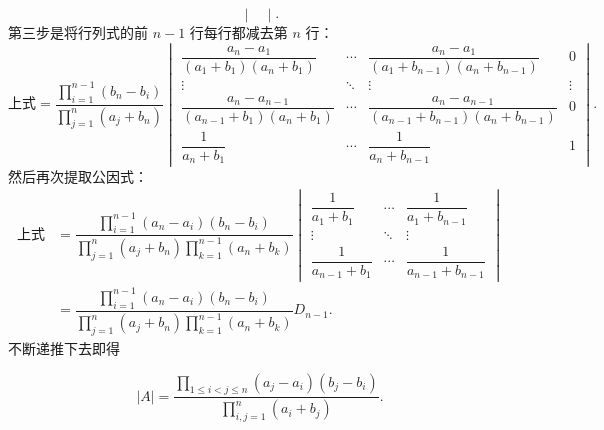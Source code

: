 \documentclass[12pt,fontset=fandol]{ctexart}
\begin{document}
\begin{solve}
\[\begin{vmatrix}
        \end{vmatrix}. \]
    第三步是将行列式的前 $n-1$ 行每行都减去第 $n$ 行：
    \[ \text{上式} = \dfrac{\prod\limits_{i=1}^{n-1}(b_n-b_i)}{\prod\limits_{j=1}^{n}(a_j+b_n)}
        \begin{vmatrix}
            \dfrac{a_n-a_1}{(a_1+b_1)(a_n+b_1)}         & \cdots & \dfrac{a_n-a_1}{(a_1+b_{n-1})(a_n+b_{n-1})}         & 0      \\[2ex]
            \vdots                                      & \ddots & \vdots                                              & \vdots \\[2ex]
            \dfrac{a_n-a_{n-1}}{(a_{n-1}+b_1)(a_n+b_1)} & \cdots & \dfrac{a_n-a_{n-1}}{(a_{n-1}+b_{n-1})(a_n+b_{n-1})} & 0      \\[2ex]
            \dfrac{1}{a_n+b_1}                          & \cdots & \dfrac{1}{a_n+b_{n-1}}                              & 1
        \end{vmatrix}. \]
    然后再次提取公因式：
    \begin{align*}
        \text{上式} & = \dfrac{\prod\limits_{i=1}^{n-1}(a_n-a_i)(b_n-b_i)}{\prod\limits_{j=1}^{n}(a_j+b_n)\prod\limits_{k=1}^{n-1}(a_n+b_k)}
        \begin{vmatrix}
            \dfrac{1}{a_1+b_1}     & \cdots & \dfrac{1}{a_1+b_{n-1}}     \\[2ex]
            \vdots                 & \ddots & \vdots                     \\[2ex]
            \dfrac{1}{a_{n-1}+b_1} & \cdots & \dfrac{1}{a_{n-1}+b_{n-1}}
        \end{vmatrix}                                                         \\[2ex]
                    & = \dfrac{\prod\limits_{i=1}^{n-1}(a_n-a_i)(b_n-b_i)}{\prod\limits_{j=1}^{n}(a_j+b_n)\prod\limits_{k=1}^{n-1}(a_n+b_k)} D_{n-1}.
    \end{align*}
    不断递推下去即得

    \[|A| = \dfrac{\prod\limits_{1 \leqslant i < j \leqslant n}(a_j - a_i)(b_j - b_i)}{\prod\limits_{i,j=1}^{n}(a_i + b_j)}.\]
\end{solve}
\end{document}
